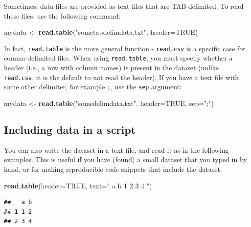\documentclass[]{book}
\newenvironment{Shaded}{\begin{snugshade}}{\end{snugshade}}
\newcommand{\DataTypeTok}[1]{\textcolor[rgb]{0.13,0.29,0.53}{#1}}
\newcommand{\KeywordTok}[1]{\textcolor[rgb]{0.13,0.29,0.53}{\textbf{#1}}}
\newcommand{\NormalTok}[1]{#1}
\newcommand{\OtherTok}[1]{\textcolor[rgb]{0.56,0.35,0.01}{#1}}
\newcommand{\StringTok}[1]{\textcolor[rgb]{0.31,0.60,0.02}{#1}}
\begin{document}
Sometimes, data files are provided as text files that are TAB-delimited. To read these files, use the following command:

\begin{Shaded}
\begin{Highlighting}[]
\NormalTok{mydata <-}\StringTok{ }\KeywordTok{read.table}\NormalTok{(}\StringTok{"sometabdelimdata.txt"}\NormalTok{, }\DataTypeTok{header=}\OtherTok{TRUE}\NormalTok{)}
\end{Highlighting}
\end{Shaded}

In fact, \texttt{read.table} is the more general function - \texttt{read.csv} is a specific case for comma-delimited files. When using \texttt{read.table}, you must specify whether a header (i.e., a row with column names) is present in the dataset (unlike \texttt{read.csv}, it is the default to not read the header). If you have a text file with some other delimiter, for example \texttt{;}, use the \texttt{sep} argument:

\begin{Shaded}
\begin{Highlighting}[]
\NormalTok{mydata <-}\StringTok{ }\KeywordTok{read.table}\NormalTok{(}\StringTok{"somedelimdata.txt"}\NormalTok{, }\DataTypeTok{header=}\OtherTok{TRUE}\NormalTok{, }\DataTypeTok{sep=}\StringTok{";"}\NormalTok{)}
\end{Highlighting}
\end{Shaded}

\hypertarget{datainscript}{%
\subsection{Including data in a script}\label{datainscript}}

You can also write the dataset in a text file, and read it as in the following examples. This is useful if you have (found) a small dataset that you typed in by hand, or for making reproducible code snippets that include the dataset.

\begin{Shaded}
\begin{Highlighting}[]
\KeywordTok{read.table}\NormalTok{(}\DataTypeTok{header=}\OtherTok{TRUE}\NormalTok{, }\DataTypeTok{text=}\StringTok{"}
\StringTok{a b}
\StringTok{1 2}
\StringTok{3 4}
\StringTok{"}\NormalTok{)}
\end{Highlighting}
\end{Shaded}

\begin{verbatim}
##   a b
## 1 1 2
## 2 3 4
\end{verbatim}
\end{document}
